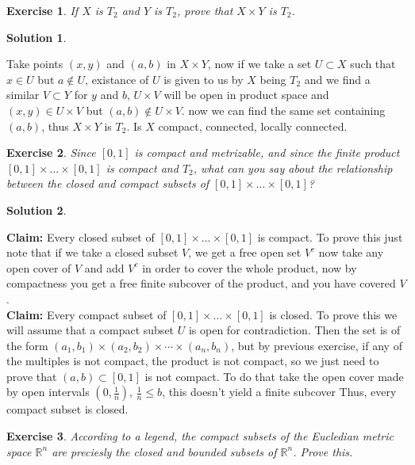 \documentclass[11pt,a4paper]{article}
\newtheorem{Ex}{Exercise}
\newtheorem{Sol}{Solution}
\begin{document}
\begin{Ex}
	If $X$ is $T_2$ and $Y$ is $T_2$, prove that $X \times Y$ is $T_2$.
\end{Ex}
\begin{Sol}\end{Sol}
\noindent Take points $(x,y)$ and $(a,b)$ in $X \times Y$, now if we take a set $U \subset X$ such that $x \in U$ but $a \not \in U$, existance of $U$ is given to us by $X$ being $T_2$ and we find a similar $V \subset Y$ for $y$ and $b$, $U \times V$ will be open in product space and $(x,y) \in U \times V$ but $(a,b) \not \in U \times V$. now we can find the same set containing $(a,b)$, thus $X \times Y$ is $T_2$. Is $X$ compact, connected, locally connected.

\begin{Ex}
	Since $[0,1]$ is compact and metrizable, and since the finite product $[0,1] \times \dots \times [0,1]$ is compact and $T_2$, what can you say about the relationship between the closed and compact subsets of $[0,1] \times \dots \times [0,1]$?   
\end{Ex}

\begin{Sol}\end{Sol}
\noindent \textbf{Claim: }Every closed subset of $[0,1] \times \dots \times [0,1]$ is compact. To prove this just note that if we take a closed subset $V$, we get a free open set $V^c$ now take any open cover of $V$ and add $V^c$ in order to cover the whole product, now by compactness you get a free finite subcover of the product, and you have covered $V$. \\
\textbf{Claim: }Every compact subset of $[0,1] \times \dots \times [0,1]$ is closed. To prove this we will assume that a compact subset $U$ is open for contradiction. Then the set is of the form $(a_1,b_1) \times (a_2,b_2) \times \cdots \times (a_n,b_n)$, but by previous exercise, if any of the multiples is not compact, the product is not compact, so we just need to prove that $(a,b) \subset [0,1]$ is not compact. To do that take the open cover made by open intervals $(0,\frac{1}{n})$, $\frac{1}{n}\le b$, this doesn't yield a finite subcover Thus, every compact subset is closed.

\begin{Ex}
	According to a legend, the compact subsets of the Eucledian metric space $\mathbb{R}^n$ are preciesly the closed and bounded subsets of $\mathbb{R}^n$. Prove this.
\end{Ex}
\end{document}
